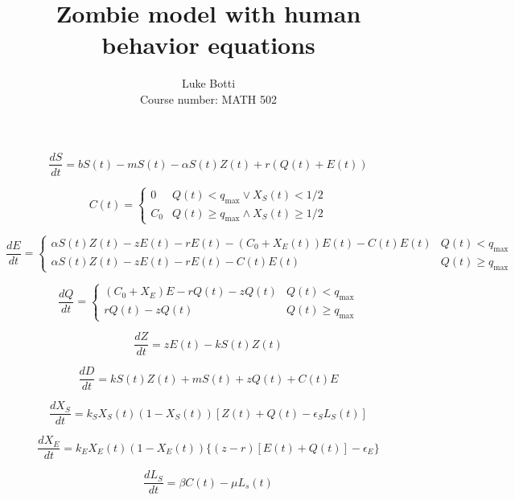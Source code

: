 \documentclass[12pt]{article}
\begin{document}
 
\title{Zombie model with human behavior equations}
\author{Luke Botti\\
Course number: MATH 502}
\maketitle
 
$$\frac{dS}{dt} = bS(t) - mS(t) -\alpha S(t)Z(t) + r(Q(t)+E(t))$$

$$C(t) = \begin{cases}
	0 & Q(t) < q_{\text{max}} \vee X_S(t) < 1/2 \\
	C_0 & Q(t) \geq q_{\text{max}} \wedge X_S(t) \geq 1/2
\end{cases}$$

$$\frac{dE}{dt} = \begin{cases} 
      \alpha S(t)Z(t) - zE(t) -rE(t) - (C_0 + X_E(t))E(t) - C(t) E(t) & Q(t) < q_{\text{max}} \\
      \alpha S(t)Z(t) - zE(t) -rE(t) - C(t) E(t) & Q(t) \geq q_{\text{max}}
   \end{cases}
$$

$$\frac{dQ}{dt} = \begin{cases}
	(C_0 + X_E)E - rQ(t) - zQ(t) & Q(t) < q_{\text{max}}\\
	rQ(t) - zQ(t) & Q(t) \geq q_{\text{max}}
\end{cases}$$

$$\frac{dZ}{dt} = zE(t) -kS(t)Z(t)$$

$$\frac{dD}{dt} = kS(t)Z(t) + mS(t) + zQ(t) + C(t)E$$

$$\frac{dX_S}{dt} = k_S X_S(t) (1 - X_S(t))[Z(t) + Q(t) - \epsilon_S L_S(t)]$$

$$\frac{dX_E}{dt} = k_E X_E(t) (1 - X_E(t))\{(z-r)[E(t) + Q(t)] - \epsilon_E\}$$

$$\frac{dL_S}{dt} = \beta C(t) - \mu L_s(t)$$
\end{document}
